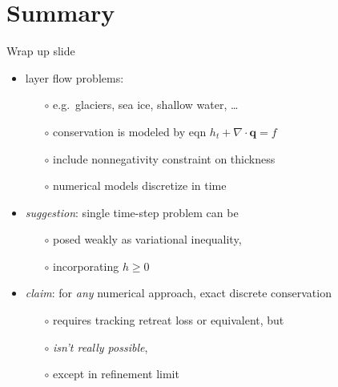 \documentclass{beamer}
\newcommand\bq{\mathbf{q}}
\newcommand{\Div}{\nabla\cdot}
\begin{document}
\section*{Summary}

\begin{frame}{Wrap up slide}

  \begin{itemize}
  \item layer flow problems:
    \begin{itemize}
    \item[$\circ$]  e.g.~glaciers, sea ice, shallow water, \dots
    \item[$\circ$]  conservation is modeled by eqn $h_t + \Div\bq = f$
    \item[$\circ$]  include nonnegativity constraint on thickness
    \item[$\circ$]  numerical models discretize in time
    \end{itemize}
  \item<2-> \emph{suggestion}:  single time-step problem can be
    \begin{itemize}
    \item[$\circ$]  posed weakly as variational inequality,
    \item[$\circ$]  incorporating $h\ge 0$
    \end{itemize}
  \item<3> \emph{claim}:  for \emph{any} numerical approach, exact discrete conservation
    \begin{itemize}
    \item[$\circ$]  requires tracking retreat loss or equivalent, but
    \item[$\circ$]  \emph{isn't really possible},
    \item[$\circ$]  except in refinement limit
    \end{itemize}
  \end{itemize}

\end{frame}
\end{document}
